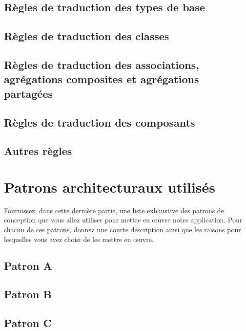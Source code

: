 \subsection{Règles de traduction des types de base}

\subsection{Règles de traduction des classes}

\subsection{Règles de traduction des associations, agrégations composites et agrégations partagées}

\subsection{Règles de traduction des composants}

\subsection{Autres règles}



\section{Patrons architecturaux utilisés}

Fournissez, dans cette dernière partie, une liste exhaustive des patrons de conception que vous allez utiliser pour mettre en œuvre notre application. 
Pour chacun de ces patrons, donnez une courte description ainsi que les raisons pour lesquelles vous avez choisi de les mettre en \oe uvre.\\


\subsection{Patron A}

\subsection{Patron B}

\subsection{Patron C}

